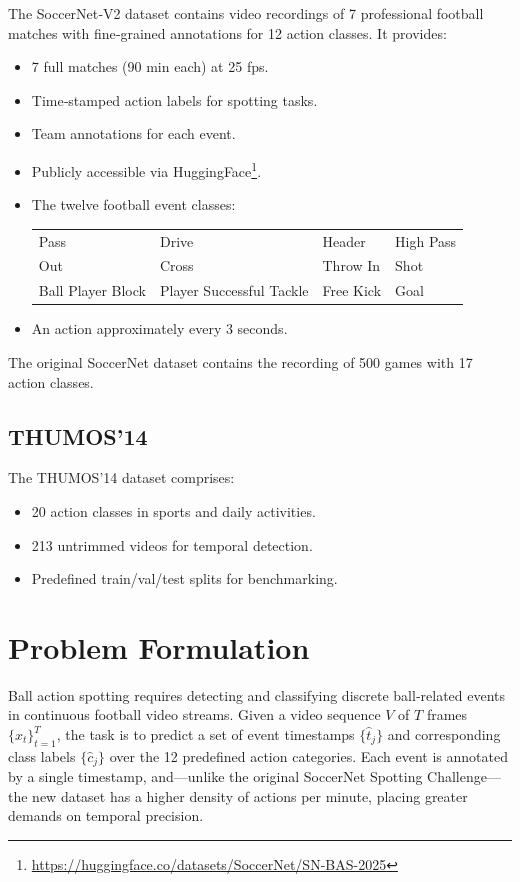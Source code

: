 The SoccerNet‑V2 dataset \cite{deliege_soccernet-v2_dataset_2021} contains video recordings of 7 professional football matches with fine‑grained annotations for 12 action classes. It provides:
\begin{itemize}
    \item 7 full matches (90 min each) at 25 fps.
    \item Time‑stamped action labels for spotting tasks.
    \item Team annotations for each event.
    \item Publicly accessible via HuggingFace\footnote{\url{https://huggingface.co/datasets/SoccerNet/SN-BAS-2025}}.
    \item The twelve football event classes:
        \begin{center}
            \begin{tabular}{llll}
                Pass & Drive & Header & High Pass \\
                Out & Cross & Throw In & Shot \\
                Ball Player Block & Player Successful Tackle & Free Kick & Goal
            \end{tabular}
        \end{center}
    \item An action approximately every 3 seconds. 
\end{itemize}

The original SoccerNet dataset contains the recording of 500 games with 17 action classes. 


\subsection{THUMOS'14}
\label{ssec:thumos}

The THUMOS'14 dataset \cite{dataset:thumos} comprises:
\begin{itemize}
    \item 20 action classes in sports and daily activities.
    \item 213 untrimmed videos for temporal detection.
    \item Predefined train/val/test splits for benchmarking.
\end{itemize}

\section{Problem Formulation}
\label{sec:problem_formulation}
Ball action spotting requires detecting and classifying discrete ball‐related events in continuous football video streams. Given a video sequence \(V\) of \(T\) frames \(\{x_t\}_{t=1}^T\), the task is to predict a set of event timestamps \(\{\hat t_j\}\) and corresponding class labels \(\{\hat c_j\}\) over the 12 predefined action categories. Each event is annotated by a single timestamp, and—unlike the original SoccerNet Spotting Challenge—the new dataset has a higher density of actions per minute, placing greater demands on temporal precision.

